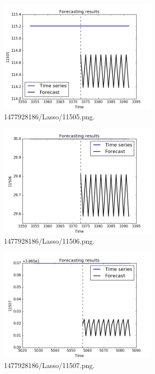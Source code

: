 \documentclass[12pt]{article}
\begin{document}
\begin{figure}
\includegraphics[width=0.7\textwidth]{1477928186/Lasso/11505.png}
\caption{1477928186/Lasso/11505.png.} \label{fg:1477928186/Lasso/11505.png}
\end{figure}

\begin{figure}
\includegraphics[width=0.7\textwidth]{1477928186/Lasso/11506.png}
\caption{1477928186/Lasso/11506.png.} \label{fg:1477928186/Lasso/11506.png}
\end{figure}

\begin{figure}
\includegraphics[width=0.7\textwidth]{1477928186/Lasso/11507.png}
\caption{1477928186/Lasso/11507.png.} \label{fg:1477928186/Lasso/11507.png}
\end{figure}
\end{document}
